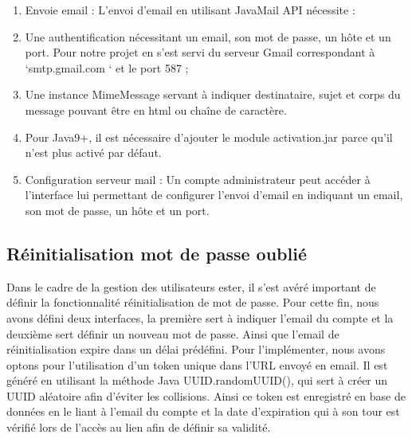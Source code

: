 \begin{itemize}
\begin{enumerate}
\item Envoie email :
L’envoi d’email en utilisant JavaMail API nécessite :
\item Une authentification nécessitant un email, son mot de passe, un hôte et un port.  Pour notre projet en s’est servi du serveur Gmail correspondant à ‘smtp.gmail.com ‘ et le port 587 ;
\item Une instance MimeMessage servant à indiquer destinataire, sujet et corps du message pouvant être en html ou chaîne de caractère.
\item Pour Java9+, il est nécessaire d’ajouter le module activation.jar parce qu’il n’est plus activé par défaut.
\item Configuration serveur mail :
Un compte administrateur peut accéder à l’interface lui permettant de configurer l’envoi d’email en indiquant un email, son mot de passe, un hôte et un port.  
\end{enumerate}


\end{itemize}
    

\subsection{Réinitialisation mot de passe oublié}
	Dans le cadre de la gestion des utilisateurs ester, il s’est avéré important de définir la fonctionnalité réinitialisation de mot de passe. Pour cette fin, nous avons défini deux interfaces, la première sert à indiquer l’email du compte et la deuxième sert définir un nouveau mot de passe.
	Ainsi que l’email de réinitialisation expire dans un délai prédéfini. Pour l’implémenter, nous avons optons pour l’utilisation d’un token unique dans l’URL envoyé en email. Il est généré en utilisant la méthode Java UUID.randomUUID(), qui sert à créer un UUID aléatoire afin d’éviter les collisions. Ainsi ce token est enregistré en base de données en le liant à l’email du compte et la date d’expiration qui à son tour est vérifié lors de l’accès au lien afin de définir sa validité.